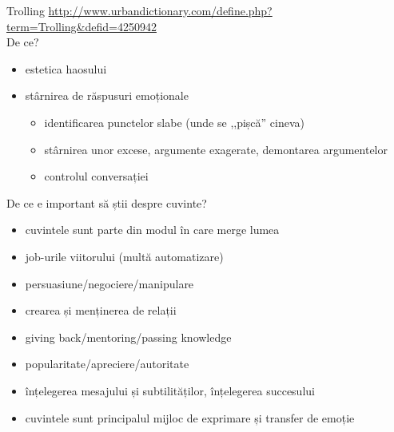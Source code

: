 \documentclass{simple}
\begin{document}
\begin{frame}{Trolling}
  \centering
  \scriptsize
  \pause
  \url{http://www.urbandictionary.com/define.php?term=Trolling&defid=4250942}\\
  \vspace{5mm}
  \normalsize
  \pause
  De ce?
  \vspace{2mm}
  \begin{itemize}
    \pause
    \item estetica haosului
    \pause
    \item stârnirea de răspusuri emoționale
      \begin{itemize}
        \pause
        \item identificarea punctelor slabe (unde se ,,pișcă'' cineva)
        \pause
        \item stârnirea unor excese, argumente exagerate, demontarea argumentelor
        \pause
        \item controlul conversației
      \end{itemize}
  \end{itemize}
\end{frame}

\begin{frame}{De ce e important să știi despre cuvinte?}
  \begin{itemize}
    \pause
    \item cuvintele sunt parte din modul în care merge lumea
    \pause
    \item job-urile viitorului (multă automatizare)
    \pause
    \item persuasiune/negociere/manipulare
    \pause
    \item crearea și menținerea de relații
    \pause
    \item giving back/mentoring/passing knowledge
    \pause
    \item popularitate/apreciere/autoritate
    \pause
    \item înțelegerea mesajului și subtilităților, înțelegerea succesului
    \pause
    \item cuvintele sunt principalul mijloc de exprimare și transfer de emoție
  \end{itemize}
\end{frame}
\end{document}
